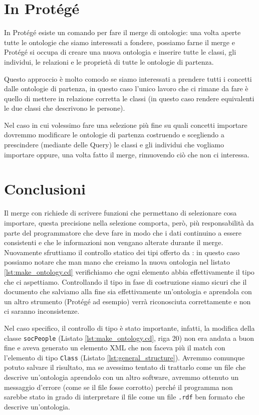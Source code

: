 \section{In Protégé}
In Protégé esiste un comando per fare il merge di ontologie: una volta aperte tutte le ontologie che siamo interessati a fondere, possiamo farne il merge e Protégé si occupa di creare una nuova ontologia e inserire tutte le classi, gli individui, le relazioni e le proprietà di tutte le ontologie di partenza. 

Questo approccio è molto comodo se siamo interessati a prendere tutti i concetti dalle ontologie di partenza, in questo caso l'unico lavoro che ci rimane da fare è quello di mettere in relazione corretta le classi (in questo caso rendere equivalenti le due classi che descrivono le persone). 

Nel caso in cui volessimo fare una selezione più fine su quali concetti importare dovremmo modificare le ontologie di partenza costruendo e scegliendo a prescindere (mediante delle Query) le classi e gli individui che vogliamo importare oppure, una volta fatto il merge, rimuovendo ciò che non ci interessa.
\section{Conclusioni}
Il merge con \cduce richiede di scrivere funzioni che permettano di selezionare cosa importare, questa precisione nella selezione comporta, però, più responsabilità da parte del programmatore che deve fare in modo che i dati continuino a essere consistenti e che le informazioni non vengano alterate durante il merge. Nuovamente sfruttiamo il controllo statico dei tipi offerto da \cduce: in questo caso possiamo notare che man mano che creiamo la nuova ontologia nel listato \ref{lst:make_ontology.cd} verifichiamo che ogni elemento abbia effettivamente il tipo che ci aspettiamo. Controllando il tipo in fase di costruzione siamo sicuri che il documento che salviamo alla fine sia effettivamente un'ontologia e aprendola con un altro strumento (Protégé ad esempio) verrà riconosciuta correttamente e non ci saranno inconsistenze.

Nel caso specifico, il controllo di tipo è stato importante, infatti, la modifica della classe \verb|socPeople| (Listato \ref{lst:make_ontology.cd}, riga 20) non era andata a buon fine e aveva generato un elemento XML che non faceva più il match con l'elemento di tipo \verb|Class| (Listato \ref{lst:general_structure}). Avremmo comunque potuto salvare il risultato, ma se avessimo tentato di trattarlo come un file che descrive un'ontologia aprendolo con un altro software, avremmo ottenuto un messaggio d'errore (come se il file fosse corrotto) perché il programma non sarebbe stato in grado di interpretare il file come un file \verb|.rdf| ben formato che descrive un'ontologia.


